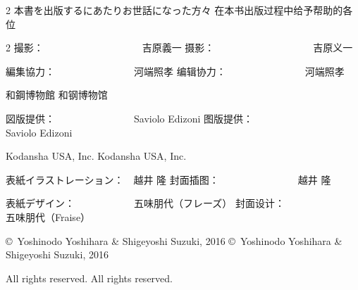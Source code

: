 \documentclass[12pt,UTF8]{ctexbook}
\begin{document}
\begin{paracol}{2}
本書を出版するにあたりお世話になった方々
\switchcolumn*
在本书出版过程中给予帮助的各位
\end{paracol}

\vspace{0.5em}

\begin{paracol}{2}
撮影：　　　　　　　　　　吉原義一
\switchcolumn*
摄影：　　　　　　　　　　吉原义一
\switchcolumn*

編集協力：　　　　　　　　河端照孝
\switchcolumn*
编辑协力：　　　　　　　　河端照孝
\switchcolumn*

和鋼博物館
\switchcolumn*
和钢博物馆
\switchcolumn*

図版提供：　　　　　　　　Saviolo Edizoni
\switchcolumn*
图版提供：　　　　　　　　Saviolo Edizoni
\switchcolumn*

Kodansha USA, Inc.
\switchcolumn*
Kodansha USA, Inc.
\switchcolumn*

表紙イラストレーション：　越井 隆
\switchcolumn*
封面插图：　　　　　　　　越井 隆
\switchcolumn*

表紙デザイン：　　　　　　五味朋代（フレーズ）
\switchcolumn*
封面设计：　　　　　　　　五味朋代（Fraise）
\switchcolumn*

\copyright\ Yoshinodo Yoshihara \& Shigeyoshi Suzuki, 2016
\switchcolumn*
\copyright\ Yoshinodo Yoshihara \& Shigeyoshi Suzuki, 2016
\switchcolumn*

All rights reserved.
\switchcolumn*
All rights reserved.
\end{paracol}
\end{document}
